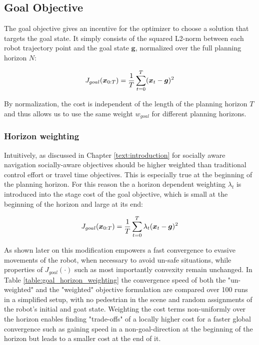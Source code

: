 \subsection{Goal Objective}
\label{text:approach/objective/goal}
The goal objective gives an incentive for the optimizer to choose a solution that targets the goal state. It simply consists of the squared L2-norm between each robot trajectory point and the goal state $\boldsymbol{g}$, normalized over the full planning horizon $N$:

\begin{equation}
J_{goal}(\boldsymbol{x}_{0:T}) = \frac{1}{T} \sum_{t = 0}^T (\boldsymbol{x}_t - \boldsymbol{g})^2
\label{eq:goal_unweighted}
\end{equation}

By normalization, the cost is independent of the length of the planning horizon $T$ and thus allows us to use the same weight $w_{goal}$ for different planning horizons.

\subsubsection{Horizon weighting}
Intuitively, as discussed in Chapter \ref{text:introduction} for socially aware navigation socially-aware objectives should be higher weighted than traditional control effort or travel time objectives. This is especially true at the beginning of the planning horizon. For this reason the a horizon dependent weighting $\lambda_t$ is introduced into the stage cost of the goal objective, which is small at the beginning of the horizon and large at its end: 

\begin{equation}
J_{goal}(\boldsymbol{x}_{0:T}) = \frac{1}{T} \sum_{t = 0}^T \lambda_t (\boldsymbol{x}_t - \boldsymbol{g})^2
\label{eq:goal_weighted}
\end{equation}

As shown later on this modification empowers a fast convergence to evasive movements of the robot, when necessary to avoid un-safe situations, while properties of $J_{goal}(\cdot)$ such as most importantly convexity remain unchanged. In Table \ref{table:goal_horizon_weighting} the convergence speed of both the "un-weighted" and the "weighted" objective formulation are compared over 100 runs in a simplified setup, with no pedestrian in the scene and random assignments of the robot's initial and goat state. Weighting the cost terms non-uniformly over the horizon enables finding "trade-offs" of a locally higher cost for a faster global convergence such as gaining speed in a non-goal-direction at the beginning of the horizon but leads to a smaller cost at the end of it. 

